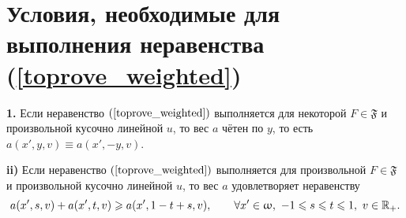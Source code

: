 \section{Условия, необходимые для выполнения неравенства (\ref{toprove_weighted})}


\begin{thm}
\label{necessary_conditions_weighted}
\textbf{1.}
Если неравенство $(\ref{toprove_weighted})$ выполняется для некоторой $F \in \mathfrak{F}$ и произвольной кусочно линейной $u$,
то вес $a$ чётен по $y$, то есть $a(x', y, v) \equiv a(x', -y, v)$.

\textbf{\textup{ii)}}
Если неравенство $(\ref{toprove_weighted})$ выполняется для произвольной $F \in \mathfrak{F}$
и произвольной кусочно линейной $u$, то вес $a$ удовлетворяет неравенству
\begin{equation}
\label{almostConcave}
a(x', s, v) + a(x', t, v) \ge a(x', 1 - t + s, v), \qquad \forall x' \in \omega,\ -1 \le s \le t \le 1,\ v \in \Real_+.
\end{equation}
\end{thm}

